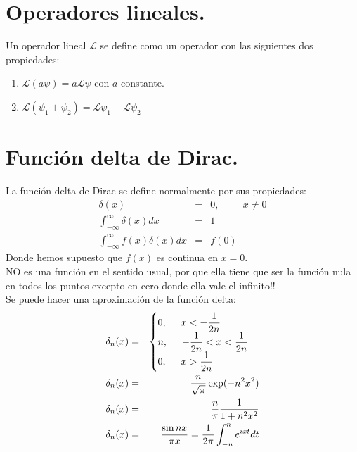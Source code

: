 \section{Operadores lineales.}
Un operador lineal $\mathcal{L}$ se define como un operador con las siguientes dos propiedades:
\begin{enumerate}
\item $\mathcal{L}(a \psi) = a \mathcal{L} \psi$ con $a$ constante.
\item $\mathcal{L} (\psi_{1} + \psi_{2}) =  \mathcal{L} \psi_{1} + \mathcal{L} \psi_{2}$
\end{enumerate}
\section{Función delta de Dirac.}
La función delta de Dirac se define normalmente por sus propiedades:
\begin{eqnarray}
\delta(x) &=& 0, \hspace{1cm} x \neq 0 \\
\int_{-\infty}^{\infty} \delta (x) dx  &=& 1 \\
\int_{-\infty}^{\infty} f(x) \delta (x) dx &=& f(0) \label{eq:derivada1}
\end{eqnarray}
Donde hemos supuesto que $f(x)$ es continua en $x=0$.
\\
NO es una función en el sentido usual, por que ella tiene que ser la función nula en todos los puntos excepto en cero donde ella vale el infinito!!
\\
Se puede hacer una aproximación de la función delta:
\begin{eqnarray}
\delta_{n} (x) &=& \begin{cases}
0, \hspace{0.5cm} x < - \dfrac{1}{2n} \\
n, \hspace{0.5cm} - \dfrac{1}{2n} < x < \dfrac{1}{2n} \\
0, \hspace{0.5cm} x > \dfrac{1}{2n}
\end{cases} \label{eq:propiedad_integral} \\
\delta_{n} (x) &=& \dfrac{n}{\sqrt{\pi}} \exp(-n^{2} x^{2}) \label{eq:derivada2} \\
\delta_{n} (x) &=& \dfrac{n}{\pi} \dfrac{1}{1 + n^{2} x^{2}} \\
\delta_{n} (x) &=& \dfrac{\sin nx}{\pi x} = \dfrac{1}{2 \pi} \int_{-n}^{n} e^{ixt} dt \label{eq:seriesF}
\end{eqnarray}

